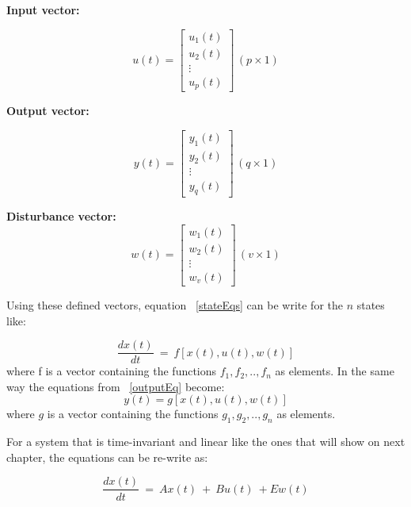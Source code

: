 \textbf{ Input vector:}
 
  \begin{equation}
 u(t)=
 \left[
 \begin{matrix}
 u_1(t)\\
 u_2(t)\\
 \vdots\\
 u_p(t)
 \end{matrix}
 \right] \, (p\times 1)
 \end{equation}
 
 \textbf{ Output vector:}
 
   \begin{equation}
y(t)=
 \left[
 \begin{matrix}
 y_1(t)\\
 y_2(t)\\
 \vdots\\
 y_q(t)
 \end{matrix}
 \right] \, (q\times 1)
 \end{equation}
 
\textbf{ Disturbance vector:}
    \begin{equation}
 w(t)=
 \left[
 \begin{matrix}
 w_1(t)\\
 w_2(t)\\
 \vdots\\
 w_v(t)
 \end{matrix}
 \right] \, (v\times 1)
 \end{equation}
 
 Using these defined vectors, equation ~\ref{stateEqs} can be write for the $n$ states like:\smallskip
 
 \begin{equation}
 	\frac{dx(t)}{dt}~=~ f[x(t),u(t),w(t)]
 \end{equation} 
 where f is a vector containing the functions $f_1,f_2,..,f_n$ as elements. In the same way the equations from ~\ref{outputEq} become:
 \begin{equation}
 	y(t)=g[x(t),u(t),w(t)]
 \end{equation}
 where $g$ is a vector containing the functions $g_1,g_2,..,g_n$ as elements.
 
 For a system that is time-invariant and linear like the ones that will show on next chapter, the equations can be re-write as:
 
 
 \begin{equation}
 	\frac{dx(t)}{dt}~=~ Ax(t)~+~Bu(t)~+Ew(t)
 \end{equation}
 
